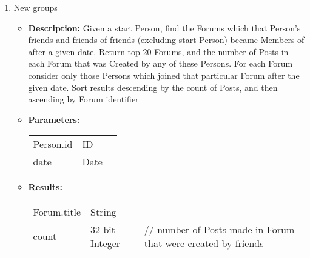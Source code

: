 {\begin{enumerate}
	\item New groups
	\begin{itemize}
		\item \textbf{Description:}
            Given a start Person, find the Forums which that Person's friends
            and friends of friends (excluding start Person) became Members of
            after a given date.  Return top 20 Forums, and the number of Posts
            in each Forum that was Created by any of these Persons.  For each
            Forum consider only those Persons which joined that particular
            Forum after the given date.  Sort results descending by the count
            of Posts, and then ascending by Forum identifier
		\item \textbf{Parameters:} \\
			\begin{tabular}{lll}
				Person.id 										& ID & \\
				date 											& Date & \\
			\end{tabular}		
		\item \textbf{Results:} \\
			\begin{tabular}{lll}
				Forum.title 										& String & \\
				count 	 											& 32-bit Integer & \parbox[t]{20cm}{// number of Posts made in Forum that were created 																							by friends \par \strut} \\
			\end{tabular}		
	\end{itemize}


\end{enumerate}}
